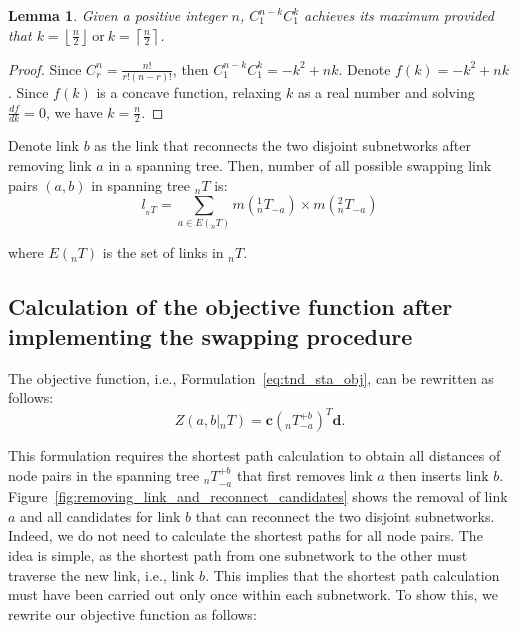 \documentclass[10pt,english]{article}
\newtheorem{lemma}[theorem]{Lemma}
\newcommand{\figref}[1]{Figure~\ref{#1}}
\begin{document}
\begin{lemma}
  Given a positive integer $n$, $C_1^{n-k}C_1^k$ achieves its maximum provided that
  $k=\left\lfloor\frac{n}{2}\right\rfloor\ \text{or}\ k=\left\lceil\frac{n}{2}\right\rceil$.
  \label{lem:max_number_of_links}
\end{lemma}
\begin{proof}
  Since $C_r^n=\frac{n!}{r!\left(n-r\right)!}$, then $C_1^{n-k}C_1^k=-k^2+nk$. Denote $f\left(k\right)=-k^2+nk$. Since $f\left(k\right)$ is a concave function, relaxing $k$ as a real number and solving $\frac{df}{dk}=0$, we have $k=\frac{n}{2}$.
\end{proof}

Denote link $b$ as the link that reconnects the two disjoint subnetworks after removing link $a$ in a spanning tree. Then, number of all possible swapping link pairs $\left(a,b\right)$ in spanning tree ${_n}T$ is:
\begin{equation}
l_{{_n}T}=\sum_{a\in E\left({_n}T\right)}{m\left({_n^1}T_{-a} \right)\times m\left({_n^2}T_{-a} \right)}\label{eq:number_of_swapping_link_pairs}
\end{equation}

where $E\left({_n}T\right)$ is the set of links in ${_n}T$.

\subsection{Calculation of the objective function after implementing the swapping procedure}

The objective function, i.e., Formulation~\ref{eq:tnd_sta_obj}, can be rewritten as follows:
\begin{equation}\label{form:objective_function}
  Z\left(a,b|{_n}T\right)=\boldsymbol{c}\left({_n}T_{-a}^{+b}\right)^T\boldsymbol{d}.
\end{equation}

This formulation requires the shortest path calculation to obtain all distances of node pairs in the spanning tree ${{_n}T}_{-a}^{+b}$ that first removes link $a$ then inserts link $b$. 
\figref{fig:removing_link_and_reconnect_candidates} shows the removal of link $a$ and all candidates for link $b$ that can reconnect the two disjoint subnetworks. Indeed, we do not need to calculate the shortest paths for all node pairs. The idea is simple, as the shortest path from one subnetwork to the other must traverse the new link, i.e., link $b$. This implies that the shortest path calculation must have been carried out only once within each subnetwork. To show this, we rewrite our objective function as follows:
\end{document}
